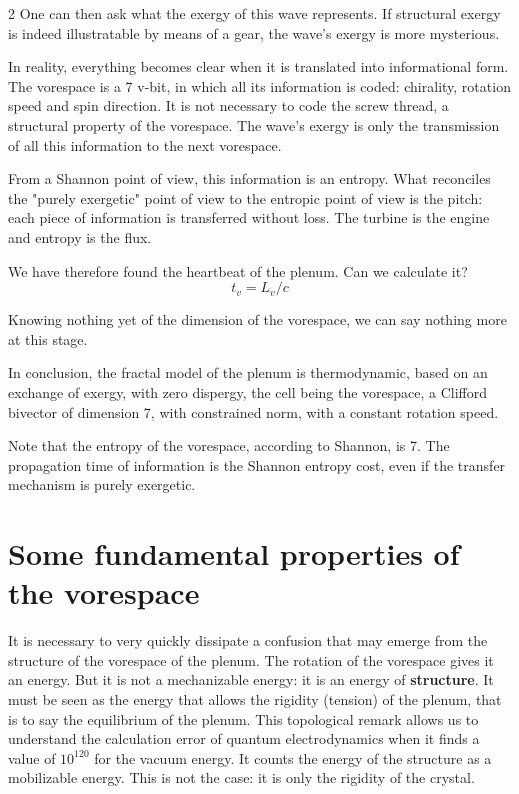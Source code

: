 \begin{multicols}{2}
	One can then ask what the exergy of 
	this wave represents. If structural exergy is indeed illustratable by means of a 
	gear, the wave's exergy is more mysterious.
	
	In reality, everything becomes clear when it is translated into 
	informational form. The vorespace is a 7 v-bit, in which 
	all its information is coded: chirality, rotation speed and 
	spin direction. It is not necessary to code the screw thread, 
	a structural property of the vorespace. The wave's exergy is only the 
	transmission of all this information to the next vorespace.
	
	From a Shannon point of view, this information is an entropy. 
	What reconciles the "purely exergetic" point of view to the 
	entropic point of view is the pitch: each piece of information is transferred without loss. 
	The turbine is the engine and entropy is the flux.
	\medskip
	
	We have therefore found the heartbeat of the plenum. Can we calculate it?
	\begin{equation*}
		t_v = L_v / c
	\end{equation*}
	
	Knowing nothing yet of the dimension of the vorespace, we can 
	say nothing more at this stage.
	\medskip
	
	In conclusion, the fractal model of the plenum is thermodynamic, based 
	on an exchange of exergy, with zero dispergy, the cell being the 
	vorespace, a Clifford bivector of dimension 7, with constrained norm, 
	with a constant rotation speed.
	
	Note that the entropy of the vorespace, according to Shannon, is 7. The 
	propagation time of information is the Shannon entropy cost, even 
	if the transfer mechanism is purely exergetic.
	
	\section{Some fundamental properties of the vorespace}
	
	It is necessary to very quickly dissipate a confusion that may emerge from the 
	structure of the vorespace of the plenum. The rotation of the vorespace 
	gives it an energy. But it is not a mechanizable energy: it is 
	an energy of \textbf{structure}. It must be seen as the energy that allows the 
	rigidity (tension) of the plenum, that is to say the equilibrium of the plenum. 
	This topological remark allows us to understand the calculation error of 
	quantum electrodynamics when it finds a value of $10^{120}$ for the 
	vacuum energy. It counts the energy of the structure as a 
	mobilizable energy. This is not the case: it is only the rigidity 
	of the crystal.
	

\end{multicols}
